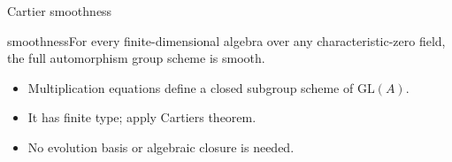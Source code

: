 \documentclass{beamer}
\begin{document}
\begin{frame}{Cartier smoothness}
\begin{bookresult}{smoothness}For every finite-dimensional algebra over any characteristic-zero field, the full automorphism group scheme is smooth.\end{bookresult}\begin{itemize}\item Multiplication equations define a closed subgroup scheme of $\mathrm{GL}(A)$.\item It has finite type; apply Cartier\textquotesingle s theorem.\item No evolution basis or algebraic closure is needed.\end{itemize}
\end{frame}
\FormalVerification
\end{document}
